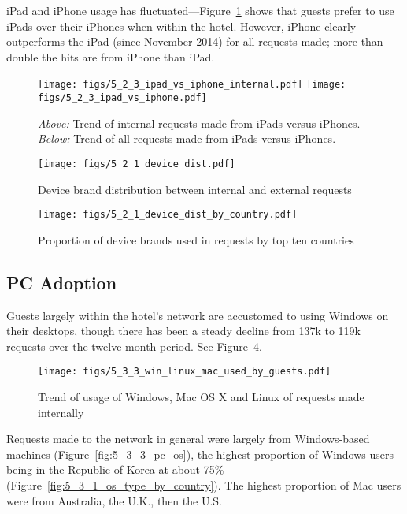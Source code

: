 \documentclass[12pt,titlepage]{article}
\begin{document}
iPad and iPhone usage has fluctuated---Figure~\ref{fig:5_2_3_ipad_vs_iphone_internal} shows that guests prefer to use iPads over their iPhones when within the hotel. However, iPhone clearly outperforms the iPad (since November 2014) for all requests made; more than double the hits are from iPhone than iPad.

\begin{figure}[thbp]
  \centering
  \texttt{[image: figs/5\_2\_3\_ipad\_vs\_iphone\_internal.pdf]}
  \texttt{[image: figs/5\_2\_3\_ipad\_vs\_iphone.pdf]}
  \caption[iPad versus iPhone requests]{\textit{Above:} Trend of internal requests made from iPads versus iPhones. \textit{Below:} Trend of all requests made from iPads versus iPhones.}
  \label{fig:5_2_3_ipad_vs_iphone_internal}
\end{figure}

\begin{figure}[thbp]
  \centering
  \texttt{[image: figs/5\_2\_1\_device\_dist.pdf]}
  \caption{Device brand distribution between internal and external requests}
  \label{fig:5_2_1_device_dist}
\end{figure}

\begin{figure}[thbp]
  \centering
  \texttt{[image: figs/5\_2\_1\_device\_dist\_by\_country.pdf]}
  \caption{Proportion of device brands used in requests by top ten countries}
  \label{fig:5_2_1_device_dist_by_country}
\end{figure}

\newpage

\subsection{PC Adoption}
\label{ssub:pc_adopt}
Guests largely within the hotel's network are accustomed to using Windows on their desktops, though there has been a steady decline from 137k to 119k requests over the twelve month period. See Figure~\ref{fig:5_3_3_win_linux_mac_used_by_guests}.

\begin{figure}[thbp]
  \centering
  \texttt{[image: figs/5\_3\_3\_win\_linux\_mac\_used\_by\_guests.pdf]}
  \caption{Trend of usage of Windows, Mac OS X and Linux of requests made internally}
  \label{fig:5_3_3_win_linux_mac_used_by_guests}
\end{figure}

Requests made to the network in general were largely from Windows-based machines (Figure~\ref{fig:5_3_3_pc_os}), the highest proportion of Windows users being in the Republic of Korea at about 75\% (Figure~\ref{fig:5_3_1_os_type_by_country}). The highest proportion of Mac users were from Australia, the U.K., then the U.S.
\end{document}
